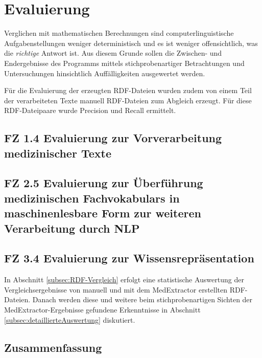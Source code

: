 \chapter{Evaluierung}
\label{ch:evaluierung}

Verglichen mit mathematischen Berechnungen sind computerlinguistische Aufgabenstellungen weniger deterministisch und es ist weniger offensichtlich, was die \emph{richtige} Antwort ist.  Aus diesem Grunde sollen die Zwischen- und Endergebnisse des Programms mittels stichprobenartiger Betrachtungen und Untersuchungen hinsichtlich Auffälligkeiten ausgewertet werden. 

Für die Evaluierung der erzeugten RDF-Dateien wurden zudem von einem Teil der verarbeiteten Texte manuell RDF-Dateien zum Abgleich erzeugt. Für diese RDF-Dateipaare wurde Precision und Recall ermittelt.


\section{FZ 1.4 Evaluierung zur Vorverarbeitung medizinischer Texte}
\label{sec:FZ1.4} 





\section[FZ 2.5 Evaluierung zur Überführung med. Fachvokabulars]{FZ 2.5 Evaluierung zur Überführung medizinischen Fachvokabulars in maschinenlesbare Form zur weiteren Verarbeitung durch NLP}
\label{sec:FZ2.5}



\section{FZ 3.4 Evaluierung zur Wissensrepräsentation}
\label{sec:FZ3.4} 
In Abschnitt \ref{subsec:RDF-Vergleich} erfolgt eine statistische Auswertung der Vergleichsergebnisse von manuell und mit dem MedExtractor erstellten RDF-Dateien. Danach werden diese und weitere beim stichprobenartigen Sichten der MedExtractor-Ergebnisse gefundene Erkenntnisse in Abschnitt \ref{subsec:detaillierteAuswertung} diskutiert.










\section{Zusammenfassung}
\label{sec:zusammenfassung_evaluierung} 

